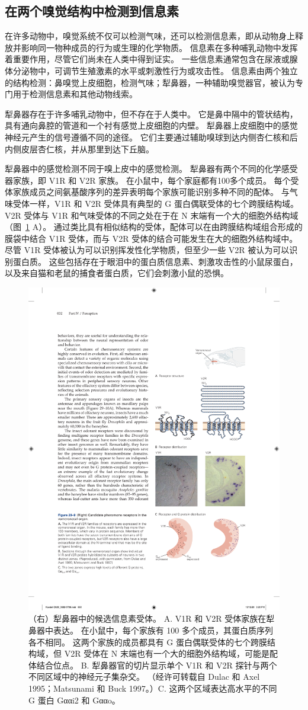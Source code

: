 \subsection{在两个嗅觉结构中检测到信息素}

在许多动物中，嗅觉系统不仅可以检测气味，还可以检测信息素，即从动物身上释放并影响同一物种成员的行为或生理的化学物质。
信息素在多种哺乳动物中发挥着重要作用，尽管它们尚未在人类中得到证实。
一些信息素通常包含在尿液或腺体分泌物中，可调节生殖激素的水平或刺激性行为或攻击性。
信息素由两个独立的结构检测：鼻嗅觉上皮细胞，检测气味；犁鼻器，一种辅助嗅觉器官，被认为专门用于检测信息素和其他动物线索。


犁鼻器存在于许多哺乳动物中，但不存在于人类中。
它是鼻中隔中的管状结构，具有通向鼻腔的管道和一个衬有感觉上皮细胞的内壁。
犁鼻器上皮细胞中的感觉神经元产生的信号遵循不同的途径。
它们主要通过辅助嗅球到达内侧杏仁核和后内侧皮层杏仁核，并从那里到达下丘脑。


犁鼻器中的感觉检测不同于嗅上皮中的感觉检测。
犁鼻器有两个不同的化学感受器家族，即 V1R 和 V2R 家族。
在小鼠中，每个家庭都有100多个成员。
每个受体家族成员之间氨基酸序列的差异表明每个家族可能识别多种不同的配体。
与气味受体一样，V1R 和 V2R 受体具有典型的 G 蛋白偶联受体的七个跨膜结构域。 
V2R 受体与 V1R 和气味受体的不同之处在于在 N 末端有一个大的细胞外结构域（图~\ref{fig:29_9} A）。
通过类比具有相似结构的受体，配体可以在由跨膜结构域组合形成的膜袋中结合 V1R 受体，而与 V2R 受体的结合可能发生在大的细胞外结构域中。
尽管 V1R 受体被认为可以识别挥发性化学物质，但至少一些 V2R 被认为可以识别蛋白质。
这些包括存在于眼泪中的蛋白质信息素、刺激攻击性的小鼠尿蛋白，以及来自猫和老鼠的捕食者蛋白质，它们会刺激小鼠的恐惧。


\begin{figure}[htbp]
	\centering
	\includegraphics[width=0.5\linewidth]{chap29/fig_29_9}
	\caption{（右）犁鼻器中的候选信息素受体。 A. V1R 和 V2R 受体家族在犁鼻器中表达。 在小鼠中，每个家族有 100 多个成员，其蛋白质序列各不相同。 这两个家族的成员都具有 G 蛋白偶联受体的七个跨膜结构域，但 V2R 受体在 N 末端也有一个大的细胞外结构域，可能是配体结合位点。 B. 犁鼻器官的切片显示单个 V1R 和 V2R 探针与两个不同区域中的神经元子集杂交。 （经许可转载自 Dulac 和 Axel 1995；Matsunami 和 Buck 1997。）C. 这两个区域表达高水平的不同 G 蛋白 Gααi2 和 Gααo。}
	\label{fig:29_9}
\end{figure}


